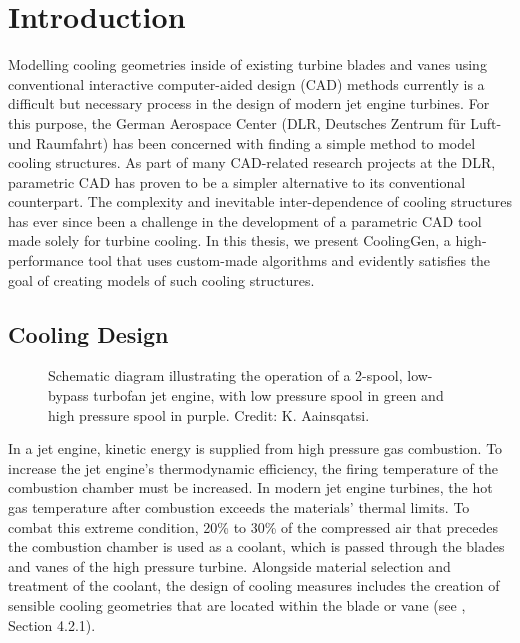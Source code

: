 \documentclass[a4paper, 11pt]{report}
\theoremstyle{definition}
\begin{document}
\restoregeometry
{}
\thispagestyle{plain}
\setcounter{page}{3}
\abstract{
	\lipsum[1]
}
\vspace{2cm}
\zusammenfassung{
	\lipsum[3]
}
\pagebreak

\restoregeometry
\tableofcontents
\pagebreak

\restoregeometry
{}
\setcounter{page}{1}
\pagestyle{plain}

\chapter{Introduction}
	Modelling cooling geometries inside of existing turbine blades and vanes using conventional interactive computer-aided design (CAD) methods currently is a difficult but necessary process in the design of modern jet engine turbines. For this purpose, the German Aerospace Center (DLR, Deutsches Zentrum für Luft- und Raumfahrt) has been concerned with finding a simple method to model cooling structures. As part of many CAD-related research projects at the DLR, parametric CAD has proven to be a simpler alternative to its conventional counterpart. The complexity and inevitable inter-dependence of cooling structures has ever since been a challenge in the development of a parametric CAD tool made solely for turbine cooling. In this thesis, we present CoolingGen, a high-performance tool that uses custom-made algorithms and evidently satisfies the goal of creating models of such cooling structures.

	\section{Cooling Design}
		\begin{figure}[H]
			\centering
			
			\caption{Schematic diagram illustrating the operation of a 2-spool, low-bypass turbofan jet engine, with low pressure spool in green and high pressure spool in purple. Credit: K. Aainsqatsi.}
		\end{figure}

		In a jet engine, kinetic energy is supplied from high pressure gas combustion. To increase the jet engine's thermodynamic efficiency, the firing temperature of the combustion chamber must be increased. In modern jet engine turbines, the hot gas temperature after combustion exceeds the materials' thermal limits. To combat this extreme condition, 20\% to 30\% of the compressed air that precedes the combustion chamber is used as a coolant, which is passed through the blades and vanes of the high pressure turbine. Alongside material selection and treatment of the coolant, the design of cooling measures includes the creation of sensible cooling geometries that are located within the blade or vane (see \cite{Giampaolo2020}, Section 4.2.1).
\end{document}
